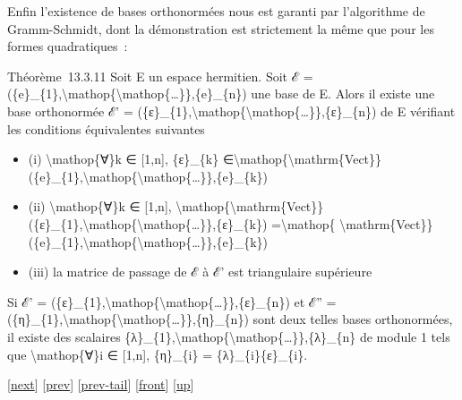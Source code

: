 \documentclass[]{article}
\begin{document}
Enfin l'existence de bases orthonormées nous est garanti par
l'algorithme de Gramm-Schmidt, dont la démonstration est strictement la
même que pour les formes quadratiques~:

Théorème~13.3.11 Soit E un espace hermitien. Soit ℰ =
(\{e\}\_\{1\},\textbackslash{}mathop\{\textbackslash{}mathop\{\ldots{}\}\},\{e\}\_\{n\})
une base de E. Alors il existe une base orthonormée ℰ' =
(\{ε\}\_\{1\},\textbackslash{}mathop\{\textbackslash{}mathop\{\ldots{}\}\},\{ε\}\_\{n\})
de E vérifiant les conditions équivalentes suivantes

\begin{itemize}
\itemsep1pt\parskip0pt
\item
  (i) \textbackslash{}mathop\{∀\}k ∈ {[}1,n{]}, \{ε\}\_\{k\}
  ∈\textbackslash{}mathop\{\textbackslash{}mathrm\{Vect\}\}(\{e\}\_\{1\},\textbackslash{}mathop\{\textbackslash{}mathop\{\ldots{}\}\},\{e\}\_\{k\})
\item
  (ii) \textbackslash{}mathop\{∀\}k ∈ {[}1,n{]},
  \textbackslash{}mathop\{\textbackslash{}mathrm\{Vect\}\}(\{ε\}\_\{1\},\textbackslash{}mathop\{\textbackslash{}mathop\{\ldots{}\}\},\{ε\}\_\{k\})
  =\textbackslash{}mathop\{
  \textbackslash{}mathrm\{Vect\}\}(\{e\}\_\{1\},\textbackslash{}mathop\{\textbackslash{}mathop\{\ldots{}\}\},\{e\}\_\{k\})
\item
  (iii) la matrice de passage de ℰ à ℰ' est triangulaire supérieure
\end{itemize}

Si ℰ' =
(\{ε\}\_\{1\},\textbackslash{}mathop\{\textbackslash{}mathop\{\ldots{}\}\},\{ε\}\_\{n\})
et ℰ'' =
(\{η\}\_\{1\},\textbackslash{}mathop\{\textbackslash{}mathop\{\ldots{}\}\},\{η\}\_\{n\})
sont deux telles bases orthonormées, il existe des scalaires
\{λ\}\_\{1\},\textbackslash{}mathop\{\textbackslash{}mathop\{\ldots{}\}\},\{λ\}\_\{n\}
de module 1 tels que \textbackslash{}mathop\{∀\}i ∈ {[}1,n{]},
\{η\}\_\{i\} = \{λ\}\_\{i\}\{ε\}\_\{i\}.

{[}\href{coursse76.html}{next}{]} {[}\href{coursse74.html}{prev}{]}
{[}\href{coursse74.html\#tailcoursse74.html}{prev-tail}{]}
{[}\href{coursse75.html}{front}{]}
{[}\href{coursch14.html\#coursse75.html}{up}{]}
\end{document}
